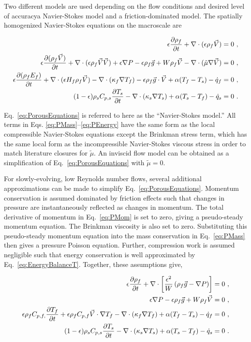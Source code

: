Two different models are used depending on the flow conditions and desired level of accuracy\mdash a Navier-Stokes model and a friction-dominated model. The spatially homogenized Navier-Stokes equations on the macroscale are

\begin{subequations}
\label{eq:PorousEquations}
\begin{align}
\label{eq:PMass}\epsilon\frac{\partial\rho_f}{\partial t} + \nabla\cdot(\epsilon\rho_f\vec{V})=0\ ,\\
\label{eq:PMom}\epsilon\frac{\partial(\rho_f\vec{V})}{\partial t}+\nabla\cdot(\epsilon\rho_f\vec{V}\vec{V})+\epsilon\nabla P-\epsilon\rho_f\vec{g}+W\rho_f\vec{V}-\nabla\cdot(\tilde{\mu}\nabla\vec{V})=0\ ,\\
\label{eq:PEnergy}\epsilon\frac{\partial (\rho_f E_f)}{\partial t}+\nabla\cdot(\epsilon H_f\rho_f\vec{V})-\nabla\cdot(\kappa_f\nabla T_f)-\epsilon\rho_f \vec{g}\cdot\vec{V}+\alpha(T_f-T_s)-\dot{q}_f=0\ ,\\
\label{eq:PSEnergy}(1-\epsilon)\rho_sC_{p,s}\frac{\partial T_s}{\partial t}-\nabla\cdot(\kappa_s\nabla T_s)+\alpha(T_s-T_f)-\dot{q}_s=0\ .
\end{align}
\end{subequations}

\noindent Eq.\ \eqref{eq:PorousEquations} is referred to here as the ``Navier-Stokes model.'' All terms in Eqs. \eqref{eq:PMass}--\eqref{eq:PEnergy} have the same form as the local compressible Navier-Stokes equations except the Brinkman stress term, which has the same local form as the incompressible Navier-Stokes viscous stress in order to match literature closures for \(\tilde{\mu}\). An inviscid flow model can be obtained as a simplification of Eq.\ \eqref{eq:PorousEquations} with \(\tilde{\mu}=0\).

For slowly-evolving, low Reynolds number flows, several additional approximations can be made to simplify Eq.\ \eqref{eq:PorousEquations}. Momentum conservation is assumed dominated by friction effects such that changes in pressure are instantaneously reflected as changes in momentum. The total derivative of momentum in Eq.\ \eqref{eq:PMom} is set to zero, giving a pseudo-steady momentum equation. The Brinkman viscosity is also set to zero. Substituting this pseudo-steady momentum equation into the mass conservation in Eq.\ \eqref{eq:PMass} then gives a pressure Poisson equation. Further, compression work is assumed negligible such that energy conservation is well approximated by Eq.\ \eqref{eq:EnergyBalanceT}. Together, these assumptions give,

\begin{subequations}
\label{eq:PrimitiveEqns}
\begin{align}
\label{eq:PMass2}
\epsilon\frac{\partial\rho_f}{\partial t}+\nabla\cdot\left\lbrack\frac{\epsilon^2}{W}\left(\rho_f\vec{g}-\nabla P\right)\right\rbrack=0\ ,\\
\label{eq:PMom2}
\epsilon\nabla P-\epsilon\rho_f\vec{g}+W\rho_f\vec{V}=0\ ,\\
\label{eq:PEnergy2}
\epsilon\rho_fC_{p,f,}\frac{\partial T_f}{\partial t}+\epsilon\rho_fC_{p,f}\vec{V}\cdot\nabla T_f-\nabla\cdot(\kappa_f\nabla T_f)+\alpha(T_f-T_s)-\dot{q}_f=0\ ,\\
\label{eq:PSEnergy2}
(1-\epsilon)\rho_sC_{p,s}\frac{\partial T_s}{\partial t}-\nabla\cdot(\kappa_s\nabla T_s)+\alpha(T_s-T_f)-\dot{q}_s=0\ .
\end{align}
\end{subequations}

